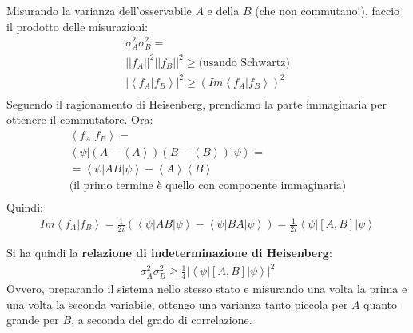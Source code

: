 Misurando la varianza dell'osservabile $A$ e della $B$ (che non commutano!), faccio il prodotto delle misurazioni:
\begin{equation}
\begin{split}
\sigma_A^2\sigma_B^2=\\
||f_A||^2||f_B||^2\ge \textrm{(usando Schwartz)}\\
|\left\langle f_A|f_B \right\rangle|^2\ge \left(Im\left\langle f_A|f_B \right\rangle\right)^2\\
\end{split}
\end{equation}
Seguendo il ragionamento di Heisenberg, prendiamo la parte immaginaria per ottenere il commutatore.
Ora:
\begin{equation}
\begin{split}
\left\langle f_A|f_B \right\rangle=\\
\left\langle \psi|\left(A-\left\langle A \right\rangle\right)\left(B-\left\langle B \right\rangle\right)|\psi  \right\rangle=\\
=\left\langle \psi |AB|\psi  \right\rangle-\left\langle A \right\rangle\left\langle B \right\rangle \\
\textrm{(il primo termine è quello con componente immaginaria)} \\
\end{split}
\end{equation}
Quindi:
\begin{equation}
\begin{split}
Im\left\langle f_A|f_B \right\rangle=\frac{1}{2i}\left(\left\langle \psi |AB|\psi  \right\rangle - \left\langle \psi |BA|\psi  \right\rangle\right)=
\frac{1}{2i}\left\langle \psi |\left[A,B\right]|\psi  \right\rangle
\end{split}
\end{equation}

Si ha quindi la \textbf{relazione di indeterminazione di Heisenberg}:
\begin{equation}\begin{split}
\sigma_A^2\sigma_B^2\ge \frac{1}{4}|\left\langle \psi |\left[A,B\right]|\psi  \right\rangle|^2
\end{split}\end{equation}
Ovvero, preparando il sistema nello stesso stato e misurando una volta la prima e una volta la seconda variabile, ottengo una varianza tanto piccola per $A$ quanto grande per $B$, a seconda del grado di correlazione.

